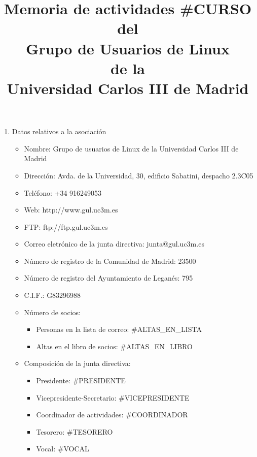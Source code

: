 \documentclass[a4paper,12pt]{report}
\title{Memoria de actividades #{CURSO}\\ del\\ Grupo de Usuarios de Linux\\ de la\\ Universidad Carlos III de Madrid}
\begin{document}
\maketitle
\begin{enumerate}
\item \textsf{\Large Datos  relativos a la asociación}
\begin{itemize}
\item{Nombre:} Grupo de usuarios de Linux de la Universidad Carlos III de Madrid
\item{Dirección:} Avda. de la Universidad, 30, edificio Sabatini, despacho 2.3C05
\item{Teléfono:} +34 916249053
\item{Web:} http://www.gul.uc3m.es
\item{FTP:} ftp://ftp.gul.uc3m.es
\item{Correo eletrónico de la junta directiva:} junta@gul.uc3m.es
\item{Número de registro de la Comunidad de Madrid:} 23500
\item{Número de registro del Ayuntamiento de Leganés:} 795
\item{C.I.F.:} G83296988
\item{Número de socios:}
\begin{itemize}
\item{Personas en la lista de correo:} #{ALTAS_EN_LISTA}
\item{Altas en el libro de socios:} #{ALTAS_EN_LIBRO}
\end{itemize}
\item{Composición de la junta directiva:}
\begin{itemize}
\item{Presidente:} #{PRESIDENTE}
\item{Vicepresidente-Secretario:} #{VICEPRESIDENTE}
\item{Coordinador de actividades:} #{COORDINADOR}
\item{Tesorero:} #{TESORERO}
\item{Vocal:} #{VOCAL}
\end{itemize} 

\newpage


\end{itemize}
\end{enumerate}
\end{document}
